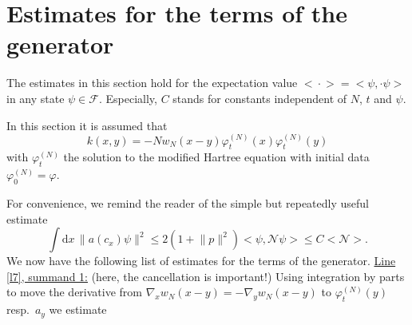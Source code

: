 \documentclass[11pt,a4paper,draft,DIV11]{scrartcl}	%
\newcommand{\fock}{\mathcal{F}}		%
\newcommand{\di}{\textrm{d}}		%
\newcommand{\Ncal}{\mathcal{N}}		%
\newcommand{\estlist}[2]{\underline{Line \ref{l#1}, summand #2:}}
\newcommand{\scal}[2]{\big<#1,#2\big>} %
\newcommand{\norm}[1]{\lVert#1\rVert}	%
\newcommand{\ev}[1]{\big<#1\big>}	%
\newcommand{\ph}{\varphi_t^{(N)}}	%
\newcommand{\bd}{\begin{displaymath}}			%
\newcommand{\ed}{\end{displaymath}}
\begin{document}

\appendix
\section{Estimates for the terms of the generator}
\label{ch:generatorestimates}
The estimates in this section hold for the expectation value $\ev{\cdot} = \scal{\psi}{\cdot\psi}$ in any state $\psi \in \fock$. Especially, $C$ stands for constants independent of $N$, $t$ and $\psi$.

In this section it is assumed that
\[k(x,y) = - N w_N(x-y)\ph(x)\ph(y)\]
with $\ph$ the solution to the modified Hartree equation with initial data $\varphi^{(N)}_0 = \varphi$.

For convenience, we remind the reader of the simple but repeatedly useful estimate
\bd
\int \di x\, \norm{a(c_x)\psi}^2 \leq 2(1+\norm{p}^2)\scal{\psi}{\Ncal\psi} \leq C\ev{\Ncal}.
\ed
We now have the following list of estimates for the terms of the generator.\newline
\estlist{7}{1} (here, the cancellation is important!)
Using integration by parts to move the derivative from $\nabla_x w_N(x-y) = - \nabla_y w_N(x-y)$ to $\ph(y)$ resp.\ $a_y$ we estimate
\end{document}
